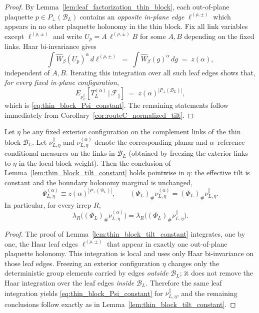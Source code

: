 \begin{proof}
By Lemma~\ref{lem:leaf_factorization_thin_block}, each out-of-plane plaquette $p\in P_{\perp}(\mathcal B_L)$ contains an \emph{opposite in-plane edge} $\ell^{(\rho,\pm)}$
which appears in no other plaquette holonomy in the thin block.
Fix all link variables except $\ell^{(\rho,\pm)}$ and write $U_p=A\,\ell^{(\rho,\pm)}B$ for some $A,B$ depending on the fixed links.
Haar bi-invariance gives
\[
\int \widehat W_{\beta}(U_p)^{\alpha}\,d\ell^{(\rho,\pm)}
\;=\;
\int \widehat W_{\beta}(g)^{\alpha}\,dg
\;=\;
z(\alpha),
\]
independent of $A,B$.
Iterating this integration over all such leaf edges shows that, \emph{for every fixed in-plane configuration},
\[
E_{\nu_L^{\parallel}}\!\left[T_L^{(\alpha)}\,\big|\,\mathscr F_{\parallel}\right]
\;=\;
z(\alpha)^{|P_{\perp}(\mathcal B_L)|},
\]
which is \eqref{eq:thin_block_Psi_constant}. The remaining statements follow immediately from
Corollary~\ref{cor:routeC_normalized_tilt}.
\end{proof}


\begin{corollary}\label{cor:thin_block_tilt_constant_uniform_eta}
Let $\eta$ be any fixed exterior configuration on the complement links of the thin block $\mathcal B_L$.
Let $\nu_{L,\eta}^{\parallel}$ and $\nu_{L,\eta}^{(\alpha)}$ denote the corresponding planar and $\alpha$--reference conditional measures on the links in $\mathcal B_L$
(obtained by freezing the exterior links to $\eta$ in the local block weight).
Then the conclusion of Lemma~\ref{lem:thin_block_tilt_constant} holds pointwise in $\eta$:
the effective tilt is constant and the boundary holonomy marginal is unchanged,
\[
\Psi_{L,\eta}^{(\alpha)}\equiv z(\alpha)^{|P_{\perp}(\mathcal B_L)|},
\qquad
(\Phi_L)_\#\nu_{L,\eta}^{(\alpha)}=(\Phi_L)_\#\nu_{L,\eta}^{\parallel}.
\]
In particular, for every irrep $R$,
\[
\lambda_R\big((\Phi_L)_\#\nu_{L,\eta}^{(\alpha)}\big)=\lambda_R\big((\Phi_L)_\#\nu_{L,\eta}^{\parallel}\big).
\]
\end{corollary}

\begin{proof}
The proof of Lemma~\ref{lem:thin_block_tilt_constant} integrates, one by one, the Haar leaf edges $\ell^{(\rho,\pm)}$ that appear in exactly one out-of-plane plaquette holonomy.
This integration is local and uses only Haar bi-invariance on those leaf edges.
Freezing an exterior configuration $\eta$ changes only the deterministic group elements carried by edges \emph{outside} $\mathcal B_L$;
it does not remove the Haar integration over the leaf edges \emph{inside} $\mathcal B_L$.
Therefore the same leaf integration yields \eqref{eq:thin_block_Psi_constant} for $\nu_{L,\eta}^{\parallel}$, and the remaining conclusions follow exactly as in Lemma~\ref{lem:thin_block_tilt_constant}.
\end{proof}



